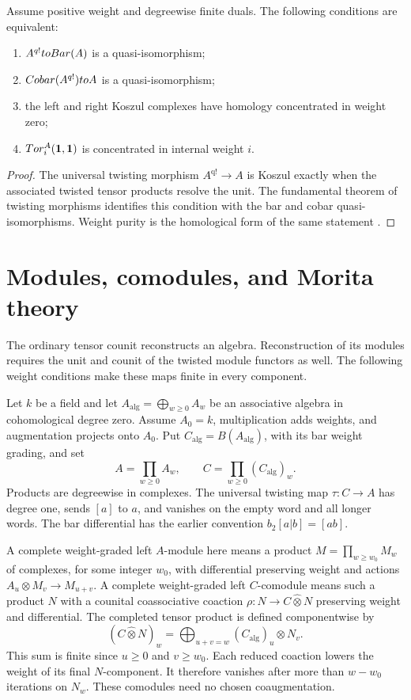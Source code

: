\begin{theorem}
Assume positive weight and degreewise finite duals. The following conditions are equivalent:
\begin{enumerate}
\item $A^{q!}toBar(A)$ is a quasi-isomorphism;
\item $Cobar(A^{q!})to A$ is a quasi-isomorphism;
\item the left and right Koszul complexes have homology concentrated in weight zero;
\item $Tor_i^A(\mathbf{1},\mathbf{1})$ is concentrated in internal weight $i$.
\end{enumerate}
\end{theorem}
\begin{proof}
The universal twisting morphism $A^{\mathrm{q!}}\to A$ is Koszul exactly when the associated twisted tensor products resolve the unit. The fundamental theorem of twisting morphisms identifies this condition with the bar and cobar quasi-isomorphisms. Weight purity is the homological form of the same statement \cite{Priddy,LV}.
\end{proof}

\section{Modules, comodules, and Morita theory}
The ordinary tensor counit reconstructs an algebra. Reconstruction of its
modules requires the unit and counit of the twisted module functors as well.
The following weight conditions make these maps finite in every component.

Let $k$ be a field and let $A_{\mathrm{alg}}=\bigoplus_{w\ge0}A_w$
be an associative algebra in cohomological degree zero.
Assume $A_0=k$, multiplication adds weights, and augmentation projects onto $A_0$.
Put $C_{\mathrm{alg}}=B(A_{\mathrm{alg}})$, with its bar weight grading, and set
\[
 A=\prod_{w\ge0}A_w,\qquad C=\prod_{w\ge0}(C_{\mathrm{alg}})_w.
\]
Products are degreewise in complexes.
The universal twisting map $\tau:C\to A$ has degree one,
sends $[a]$ to $a$, and vanishes on the empty word and all longer words.
The bar differential has the earlier convention $b_2[ a|b]=[ab]$.

A complete weight-graded left $A$-module here means a product
$M=\prod_{w\ge w_0}M_w$ of complexes, for some integer $w_0$,
with differential preserving weight and actions $A_u\otimes M_v\to M_{u+v}$.
A complete weight-graded left $C$-comodule means such a product $N$
with a counital coassociative coaction
$\rho:N\to C\widehat\otimes N$ preserving weight and differential.
The completed tensor product is defined componentwise by
\[
 (C\widehat\otimes N)_w
 =\bigoplus_{u+v=w}(C_{\mathrm{alg}})_u\otimes N_v.
\]
This sum is finite since $u\ge0$ and $v\ge w_0$.
Each reduced coaction lowers the weight of its final $N$-component.
It therefore vanishes after more than $w-w_0$ iterations on $N_w$.
These comodules need no chosen coaugmentation.

